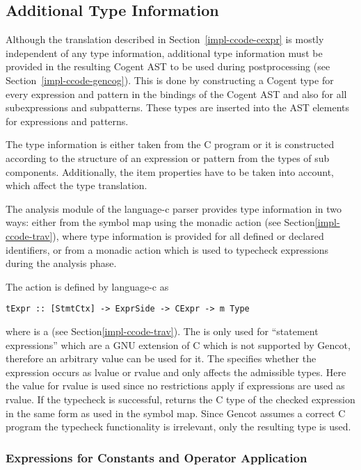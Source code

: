 \subsection{Additional Type Information}
\label{impl-ccode-type}

Although the translation described in Section~\ref{impl-ccode-cexpr} is mostly independent of any type
information, additional type information must be provided in the resulting Cogent AST to be used during
postprocessing (see Section~\ref{impl-ccode-gencog}). This is done by constructing a Cogent type for every
expression and pattern in the bindings of the Cogent AST and also for all subexpressions and subpatterns.
These types are inserted into the AST elements for expressions and patterns.

The type information is either taken from the C program or it is constructed according to the structure of an
expression or pattern from the types of sub components. Additionally, the item properties have to be taken
into account, which affect the type translation.

The analysis module of the language-c parser provides type information in two ways: either from the symbol map
using the monadic action  (see Section\ref{impl-ccode-trav}), where type information is
provided for all defined or declared identifiers, or from a monadic action  which is used to
typecheck expressions during the analysis phase.

The action  is defined by language-c as
\begin{verbatim}
tExpr :: [StmtCtx] -> ExprSide -> CExpr -> m Type
\end{verbatim}
where  is a  (see Section\ref{impl-ccode-trav}). The  is only used for
``statement expressions'' which are a GNU extension of C which is not supported by Gencot, therefore an arbitrary
value can be used for it. The  specifies whether the expression occurs as lvalue or rvalue and
only affects the admissible types. Here the value for rvalue is used since no restrictions apply if expressions
are used as rvalue. If the typecheck is successful,  returns the C type of the checked expression
in the same form as used in the symbol map. Since Gencot assumes a correct C program the typecheck functionality
is irrelevant, only the resulting type is used.

\subsubsection{Expressions for Constants and Operator Application}

